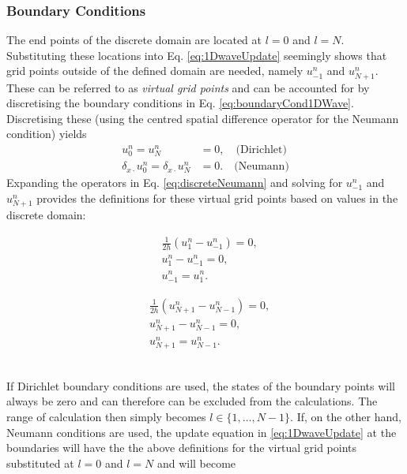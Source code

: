 \subsubsection{Boundary Conditions}
The end points of the discrete domain are located at $l = 0$ and $l = N$.
Substituting these locations into Eq. \eqref{eq:1DwaveUpdate} seemingly shows that grid points outside of the defined domain are needed, namely $u_{-1}^n$ and $u_{N+1}^n$. These can be referred to as \textit{virtual grid points} and can be accounted for %
by discretising the boundary conditions in Eq. \eqref{eq:boundaryCond1DWave}. Discretising these (using the centred spatial difference operator for the Neumann condition) yields
\begin{subequations}
    \begin{align}
        u_0^n = u_N^n &= 0, \quad\text{(Dirichlet)}\label{eq:discreteDirichlet}\\
        \delta_{x\cdot} u_0^n = \delta_{x\cdot} u_N^n &= 0. \quad \text{(Neumann)}\label{eq:discreteNeumann}
    \end{align}
\end{subequations}
Expanding the operators in Eq. \eqref{eq:discreteNeumann} and solving for $u_{-1}^n$ and $u_{N+1}^n$ provides the definitions for these virtual grid points based on values in the discrete domain:

\begin{minipage}[c]{0.49\textwidth}
    \begin{align*}
        &\frac{1}{2h} \left(u_1^n - u_{-1}^n\right) = 0,\\
        &u_1^n - u_{-1}^n = 0,\\
        &u_{-1}^n = u_1^n.
    \end{align*}
\end{minipage}
\begin{minipage}[c]{0.49\textwidth}
    \begin{align*}
        &\frac{1}{2h} \left(u_{N+1}^n - u_{N-1}^n\right) = 0,\\
        &u_{N+1}^n - u_{N-1}^n = 0,\\
        &u_{N+1}^n = u_{N-1}^n.
    \end{align*}
\end{minipage}
\\

\noindent If Dirichlet boundary conditions are used, the states of the boundary points will always be zero and can therefore can be excluded from the calculations. The range of calculation then simply becomes $l\in\{1,\hdots, N-1\}$. If, on the other hand, Neumann conditions are used, the update equation in \eqref{eq:1DwaveUpdate} at the boundaries will have the the above definitions for the virtual grid points substituted at $l = 0$ and $l = N$ and will become 

